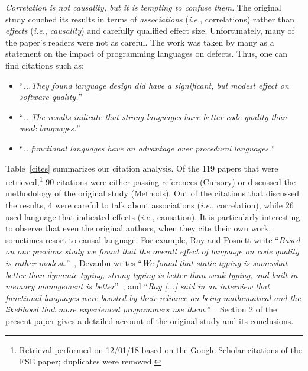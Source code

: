 \documentclass[acmsmall]{acmart}
\newcommand{\ie}{\emph{i.e.}\xspace}
\begin{document}
\emph{Correlation is not causality, but it is tempting to confuse them.}
The original study couched its results in terms of \emph{associations} (\ie,
correlations) rather than \emph{effects} (\ie, \emph{causality}) and
carefully qualified effect size.  Unfortunately, many of the paper's readers
were not as careful. The work was taken by many as a statement on the impact
of programming languages on defects. Thus, one can find citations such as:
\begin{itemize}
\item ``\emph{...They found language design did have a significant, but
  modest effect on software quality.}''\,\cite{one}
\item ``\emph{...The results indicate that strong languages have better
  code quality than weak languages.}''\,\cite{three} 
\item ``\emph{...functional languages have an advantage over procedural
  languages.}''\,\cite{nine}
\end{itemize}

\begin{table}
\caption{Citation analysis}\label{cites}
\vspace{-6mm}
\end{table}

\noindent Table~\ref{cites} summarizes our citation analysis. Of the 119
papers that were retrieved,\footnote{Retrieval performed on 12/01/18 based
  on the Google Scholar citations of the FSE paper; duplicates were
  removed.}  90 citations were either passing references (Cursory) or
discussed the methodology of the original study (Methods). Out of the
citations that discussed the results, 4 were careful to talk about
associations (\ie, correlation), while 26 used language that indicated
effects (\ie, causation). It is particularly interesting to observe that
even the original authors, when they cite their own work, sometimes resort to
causal language. For example, Ray and Posnett write ``\emph{Based on our previous study
  \cite{ray14} we found that the overall effect of language on code quality
  is rather modest.}''~\cite{book}, Devanbu writes ``\emph{We found that
  static typing is somewhat better than dynamic typing, strong typing is
  better than weak typing, and built-in memory management is
  better}''~\cite{prem}, and ``\emph{Ray [...] said in an interview that
  functional languages were boosted by their reliance on being mathematical
  and the likelihood that more experienced programmers use
  them.}''~\cite{info}.  Section 2 of the present paper gives a detailed
account of the original study and its conclusions.
\end{document}
